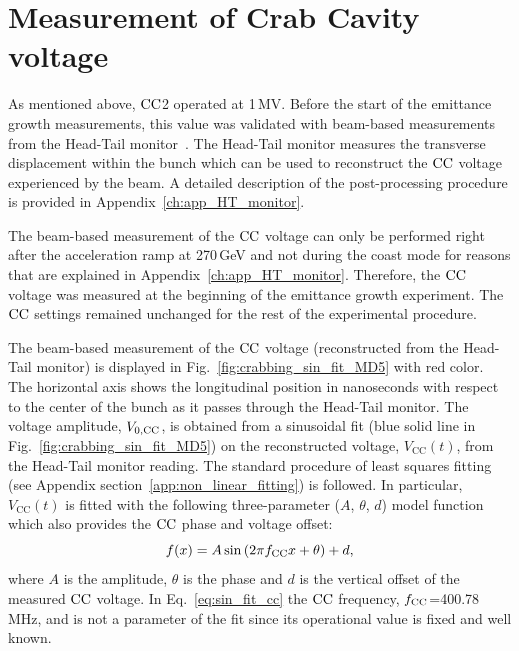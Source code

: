 \section{Measurement of Crab Cavity voltage}\label{subsec:CC_voltage_2018_measurement}
As mentioned above, ${\mathrm{CC}}$2 operated at 1\,MV. Before the start of the emittance growth measurements, this value was validated with beam-based measurements from the Head-Tail monitor~\cite{sps_headtail_monitor}. The Head-Tail monitor measures the transverse displacement within the bunch which can be used to reconstruct the ${\mathrm{CC}}$ voltage experienced by the beam. A detailed description of the post-processing procedure is provided in Appendix~\ref{ch:app_HT_monitor}.

The beam-based measurement of the ${\mathrm{CC}}$ voltage can only be performed right after the acceleration ramp at 270\,GeV and not during the coast mode for reasons that are explained in Appendix~\ref{ch:app_HT_monitor}. Therefore, the ${\mathrm{CC}}$ voltage was measured at the beginning of the emittance growth experiment.%
 The ${\mathrm{CC}}$ settings remained unchanged for the rest of the experimental procedure.

The beam-based measurement of the ${\mathrm{CC}}$ voltage (reconstructed from the Head-Tail monitor) is displayed in Fig.~\ref{fig:crabbing_sin_fit_MD5} with red color. The horizontal axis shows the longitudinal position in nanoseconds with respect to the center of the bunch as it passes through the Head-Tail monitor. The voltage amplitude, ${V_\mathrm{0, CC}}$, is obtained from a sinusoidal fit (blue solid line in Fig.~\ref{fig:crabbing_sin_fit_MD5}) on the reconstructed voltage, $V_\mathrm{CC}(t)$, from the Head-Tail monitor reading. The standard procedure of least squares fitting (see Appendix section~\ref{app:non_linear_fitting}) is followed. In particular, $V_\mathrm{CC}(t)$ is fitted with the following three-parameter ($A$, $\theta$, $d$) model function which also provides the ${\mathrm{CC}}$ phase and voltage offset:
\begin{equation}\label{eq:sin_fit_cc}
   f(x) = A \sin{(2\pi {f_\mathrm{CC}}x + \theta)} + d ,
\end{equation}
where $A$ is the amplitude, $\theta$ is the phase and $d$ is the vertical offset of the measured ${\mathrm{CC}}$ voltage. In Eq.~\eqref{eq:sin_fit_cc} the ${\mathrm{CC}}$ frequency, ${f_\mathrm{CC}}$=400.78\,MHz, and is not a parameter of the fit since its operational value is fixed and well known.



